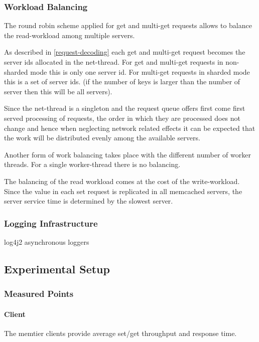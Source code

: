 \documentclass[11pt,a4paper]{article}
\begin{document}
\subsubsection{Workload Balancing}\label{workload-balancing}
The round robin scheme applied for get and multi-get requests allows to balance the read-workload among multiple servers.

As described in \ref{request-decoding} each get and multi-get request becomes the server ids allocated in the net-thread.
For get and multi-get requests in non-sharded mode this is only one server id. For multi-get requests in sharded mode this is a set of server ids. (if the number of keys is larger than the number of server then this will be all servers).

Since the net-thread is a singleton and the request queue offers first come first served processing of requests, the order in which they are processed does not change and hence when neglecting network related effects it can be expected that the work will be distributed evenly among the available servers.

Another form of work balancing takes place with the different number of worker threads. For a single worker-thread there is no balancing. 

The balancing of the read workload comes at the cost of the write-workload. Since the value in each set request is replicated in all memcached servers, the server service time is determined by the slowest server. 


\subsubsection{Logging Infrastructure}

log4j2 asynchronous loggers


\subsection{Experimental Setup}

\subsubsection{Measured Points}\label{measured-points}
\paragraph{Client}
The memtier clients provide average set/get throughput and response time.
\end{document}
